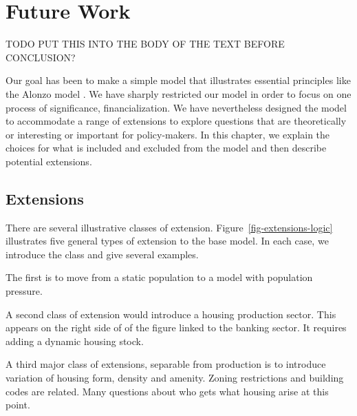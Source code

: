 \chapter[Future Work]{Future Work} \label{appendix-future-work}

TODO PUT THIS INTO THE BODY OF THE TEXT BEFORE CONCLUSION?

Our goal has been to make a simple model that illustrates essential principles like the %
Alonzo model \cite{alonsoLocationLandUse1964}. We have sharply restricted our model  in order to focus on one process of significance, financialization.  %
We have nevertheless designed the model to accommodate a range of extensions to explore questions that are theoretically or interesting or important for policy-makers. 
In this chapter, we explain the choices for what is included and excluded from the model and then describe potential extensions.




\section{Extensions}
There are several illustrative classes of extension. Figure~\ref{fig-extensions-logic} illustrates five general types of extension to the base model.  In each case, we introduce the class and give several examples. 

The first is to move from a static population to a model with population pressure. %

A second class of extension would introduce a housing production sector. This appears on the right side of of the figure linked to the banking sector. It requires adding a dynamic housing stock. 

A third major class of extensions, separable from production is to introduce variation of housing form,  density and amenity. Zoning restrictions and building codes are related. Many questions about who gets what housing arise at this point. 

